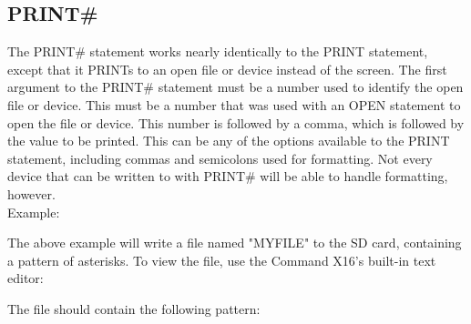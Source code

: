 \subsection{PRINT\#}

The {\ttfamily PRINT\#} statement works nearly identically to the {\ttfamily
PRINT} statement, except that it {\ttfamily PRINT}s to an open file or device
instead of the screen.  The first argument to the {\ttfamily PRINT\#} statement
must be a number used to identify the open file or device.  This must be a
number that was used with an {\ttfamily OPEN} statement to open the file or
device.  This number is followed by a comma, which is followed by the value to
be printed.  This can be any of the options available to the {\ttfamily PRINT}
statement, including commas and semicolons used for formatting.  Not every
device that can be written to with {\ttfamily PRINT\#} will be able to handle
formatting, however.\\

Example:\\


The above example will write a file named "MYFILE" to the SD card, containing a
pattern of asterisks.  To view the file, use the Command X16's built-in text
editor:\\


The file should contain the following pattern:\\

\codeblock{
	*\\
	**\\
	***\\
	****\\
	*****\\
	******\\
	*******\\
	********\\
	*********\\
	**********\\
}

